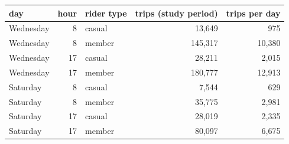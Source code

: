 \begin{tabular}{lrlrr}
\toprule
\textbf{day} & \textbf{hour} & \textbf{rider type} & \textbf{trips (study period)} & \textbf{trips per day} \\
\midrule
Wednesday & 8 & casual & 13,649 & 975 \\
Wednesday & 8 & member & 145,317 & 10,380 \\
Wednesday & 17 & casual & 28,211 & 2,015 \\
Wednesday & 17 & member & 180,777 & 12,913 \\
Saturday & 8 & casual & 7,544 & 629 \\
Saturday & 8 & member & 35,775 & 2,981 \\
Saturday & 17 & casual & 28,019 & 2,335 \\
Saturday & 17 & member & 80,097 & 6,675 \\
\bottomrule
\end{tabular}
